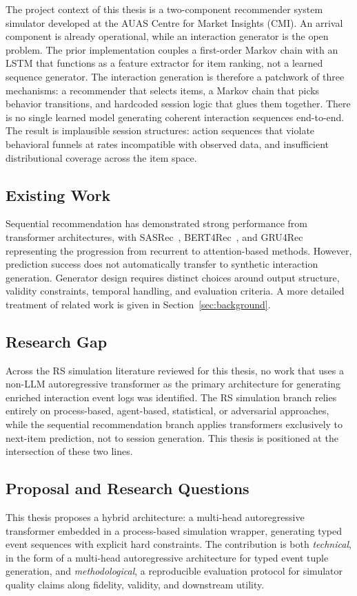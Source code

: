 \documentclass[sigconf,nonacm]{acmart}
\begin{document}
The project context of this thesis is a two-component recommender system
simulator developed at the AUAS Centre for Market Insights (CMI). An arrival
component is already operational, while an interaction generator is the open
problem. The prior implementation couples a first-order Markov chain with an
LSTM that functions as a feature extractor for item ranking, not a learned
sequence generator. The interaction generation is therefore a patchwork of
three mechanisms: a recommender that selects items, a Markov chain that picks
behavior transitions, and hardcoded session logic that glues them together.
There is no single learned model generating coherent interaction sequences
end-to-end. The result is implausible session structures: action sequences
that violate behavioral funnels at rates incompatible with observed data, and
insufficient distributional coverage across the item space.

\subsection{Existing Work}
Sequential recommendation has demonstrated strong performance from transformer
architectures, with SASRec~\cite{kang2018sasrec},
BERT4Rec~\cite{sun2019bert4rec}, and GRU4Rec~\cite{hidasi2015gru4rec}
representing the progression from recurrent to attention-based methods.
However, prediction success does not automatically transfer to synthetic
interaction generation. Generator design requires distinct choices around
output structure, validity constraints, temporal handling, and evaluation
criteria. A more detailed treatment of related work is given in
Section~\ref{sec:background}.

\subsection{Research Gap}
Across the RS simulation literature reviewed for this thesis, no work that
uses a non-LLM autoregressive transformer as the primary architecture for
generating enriched interaction event logs was identified. The RS simulation
branch relies entirely on process-based, agent-based, statistical, or
adversarial approaches, while the sequential recommendation branch applies
transformers exclusively to next-item prediction, not to session generation.
This thesis is positioned at the intersection of these two lines.

\subsection{Proposal and Research Questions}
This thesis proposes a hybrid architecture: a multi-head autoregressive
transformer embedded in a process-based simulation wrapper, generating typed
event sequences with explicit hard constraints. The contribution is both
\emph{technical}, in the form of a multi-head autoregressive architecture for
typed event tuple generation, and \emph{methodological}, a reproducible
evaluation protocol for simulator quality claims along fidelity, validity,
and downstream utility.
\end{document}
